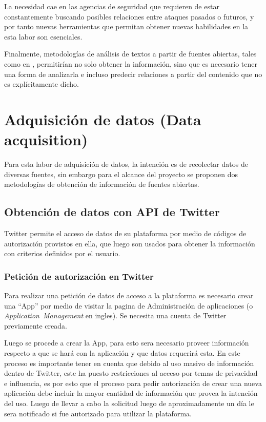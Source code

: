 La necesidad cae en las agencias de seguridad que requieren de estar constantemente buscando posibles relaciones entre ataques pasados o futuros, y por tanto nuevas herramientas que permitan obtener nuevas habilidades en la esta labor son esenciales.

Finalmente, metodologías de análisis de textos a partir de fuentes abiertas, tales como en \cite{osint}, permitirían no solo obtener la información, sino que es necesario tener una forma de analizarla e incluso predecir relaciones a partir del contenido que no es explícitamente dicho.


\section{Adquisición de datos (Data acquisition)} \label{sec:data-acquisition}
Para esta labor de adquisición de datos, la intención es de recolectar datos de diversas fuentes, sin embargo para el alcance del proyecto se proponen dos metodologías de obtención de información de fuentes abiertas.

\subsection{Obtención de datos con API de Twitter}
Twitter permite el acceso de datos de su plataforma por medio de códigos de autorización provistos en ella, que luego son usados para obtener la información con criterios definidos por el usuario.

\subsubsection{Petición de autorización en Twitter}
Para realizar una petición de datos de acceso a la plataforma es necesario crear una ``App'' por medio de visitar la pagina de Administración de aplicaciones (o \emph{Application~Management} en ingles). Se necesita una cuenta de Twitter previamente creada.

Luego se procede a crear la App, para esto sera necesario proveer información respecto a que se hará con la aplicación y que datos requerirá esta. En este proceso es importante tener en cuenta que debido al uso masivo de información dentro de Twitter, este ha puesto restricciones al acceso por temas de privacidad e influencia, es por esto que el proceso para pedir autorización de crear una nueva aplicación debe incluir la mayor cantidad de información que provea la intención del uso. Luego de llevar a cabo la solicitud luego de aproximadamente un día le sera notificado si fue autorizado para utilizar la plataforma.


